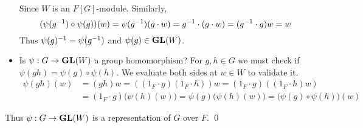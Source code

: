 \begin{itemize}
	Since $W$ is an $F[G]$-module. Similarly,
	$$(\psi(g^{-1})\circ \psi(g))(w) = \psi(g^{-1})(g\cdot w) = g^{-1}\cdot(g\cdot w) = (g^{-1} \cdot g)w = w$$
	Thus $\psi(g)^{-1} = \psi(g^{-1})$ and $\psi(g)\in \mathrm{\mathbf{GL}}(W)$.
	\item Is $\psi: G\rightarrow \mathrm{\mathbf{GL}}(W)$ a group homomorphism? For $g, h\in G$ we must check if $\psi(gh)=\psi(g)\circ\psi(h)$. We evaluate both sides at $w\in W$ to validate it.
	$$\begin{aligned}
	\psi(gh)(w) &= (gh)w = ((1_F\cdot g)(1_F\cdot h))w = (1_F\cdot g)((1_F\cdot h)w)\\
	&= (1_F\cdot g)\big(\psi(h)(w)\big) = \psi(g)\big(\psi(h)(w)\big) = \big(\psi(g)\circ\psi(h)\big)(w)
	\end{aligned}$$
\end{itemize}
Thus $\psi: G\rightarrow \mathrm{\mathbf{GL}}(W)$ is a representation of $G$ over $F$. \qed
\pagebreak